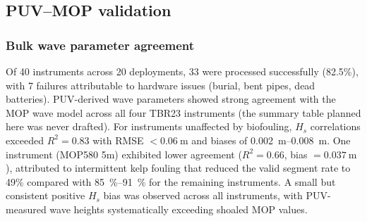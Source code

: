 \label{sec:results-status}


\subsection{PUV--MOP validation}

\subsubsection{Bulk wave parameter agreement}

Of 40 instruments across 20 deployments, 33 were processed successfully
(82.5\%), with 7 failures attributable to hardware issues (burial, bent
pipes, dead batteries). PUV-derived wave parameters showed strong
agreement with the MOP wave model across all four TBR23 instruments
(the summary table planned here was never drafted). For instruments unaffected by biofouling,
$H_s$ correlations exceeded $R^2 = 0.83$ with RMSE $<
\SI{0.06}{\meter}$ and biases of \SIrange{+0.002}{+0.008}{\meter}. One
instrument (MOP580 5m) exhibited lower agreement ($R^2 = 0.66$, bias $=
\SI{+0.037}{\meter}$), attributed to intermittent kelp fouling that
reduced the valid segment rate to 49\% compared with
\SIrange{85}{91}{\percent} for the remaining instruments. A small but
consistent positive $H_s$ bias was observed across all instruments, with
PUV-measured wave heights systematically exceeding shoaled MOP values.

